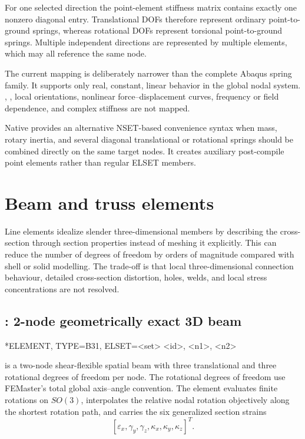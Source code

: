 For one selected direction the point-element stiffness matrix contains exactly one nonzero diagonal entry. Translational DOFs therefore represent ordinary point-to-ground springs, whereas rotational DOFs represent torsional point-to-ground springs. Multiple independent directions are represented by multiple  elements, which may all reference the same node.

The current mapping is deliberately narrower than the complete Abaqus spring family. It supports only real, constant, linear  behavior in the global nodal system. , , local orientations, nonlinear force--displacement curves, frequency or field dependence, and complex stiffness are not mapped.

Native  provides an alternative NSET-based convenience syntax when mass, rotary inertia, and several diagonal translational or rotational springs should be combined directly on the same target nodes. It creates auxiliary post-compile point elements rather than regular ELSET members.

\section{Beam and truss elements}

Line elements idealize slender three-dimensional members by describing the cross-section through section properties instead of meshing it explicitly. This can reduce the number of degrees of freedom by orders of magnitude compared with shell or solid modelling. The trade-off is that local three-dimensional connection behaviour, detailed cross-section distortion, holes, welds, and local stress concentrations are not resolved.

\clearpage
\subsection{: 2-node geometrically exact 3D beam}

\begin{syntax}
*ELEMENT, TYPE=B31, ELSET=<set>
<id>, <n1>, <n2>
\end{syntax}

 is a two-node shear-flexible spatial beam with three translational and three rotational degrees of freedom per node. The rotational degrees of freedom use FEMaster's total global axis--angle convention. The element evaluates finite rotations on \(SO(3)\), interpolates the relative nodal rotation objectively along the shortest rotation path, and carries the six generalized section strains
\[
[\varepsilon_x,\gamma_y,\gamma_z,\kappa_x,\kappa_y,\kappa_z]^T .
\]

